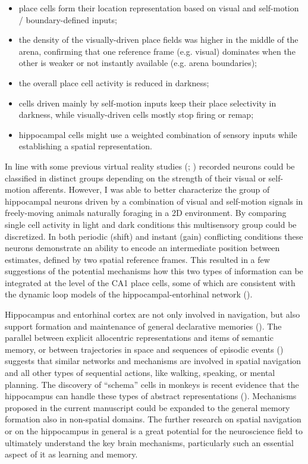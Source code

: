 \begin{itemize}
    \item place cells form their location representation based on visual and self-motion / boundary-defined inputs;
    \item the density of the visually-driven place fields was higher in the middle of the arena, confirming that one reference frame (e.g. visual) dominates when the other is weaker or not instantly available (e.g. arena boundaries);
    \item the overall place cell activity is reduced in darkness;
    \item cells driven mainly by self-motion inputs keep their place selectivity in darkness, while visually-driven cells mostly stop firing or remap;
    \item hippocampal cells might use a weighted combination of sensory inputs while establishing a spatial representation.
\end{itemize}

In line with some previous virtual reality studies (\cite{Chen2013}; \cite{Haas2019}) recorded neurons could be classified in distinct groups depending on the strength of their visual or self-motion afferents. However, I was able to better characterize the group of hippocampal neurons driven by a combination of visual and self-motion signals in freely-moving animals naturally foraging in a 2D environment. By comparing single cell activity in light and dark conditions this multisensory group could be discretized. In both periodic (shift) and instant (gain) conflicting conditions these neurons demonstrate an ability to encode an intermediate position between estimates, defined by two spatial reference frames. This resulted in a few suggestions of the potential mechanisms how this two types of information can be integrated at the level of the CA1 place cells, some of which are consistent with the dynamic loop models of the hippocampal-entorhinal network (\cite{Li2020}).

Hippocampus and entorhinal cortex are not only involved in navigation, but also support formation and maintenance of general declarative memories (\cite{Scoville2000}). The parallel between explicit allocentric representations and items of semantic memory, or between trajectories in space and sequences of episodic events (\cite{Buzsaki2013}) suggests that similar networks and mechanisms are involved in spatial navigation and all other types of sequential actions, like walking, speaking, or mental planning. The discovery of “schema” cells in monkeys is recent evidence that the hippocampus can handle these types of abstract representations (\cite{Baraduc2019}). Mechanisms proposed in the current manuscript could be expanded to the general memory formation also in non-spatial domains. The further research on spatial navigation or on the hippocampus in general is a great potential for the neuroscience field to ultimately understand the key brain mechanisms, particularly such an essential aspect of it as learning and memory.
